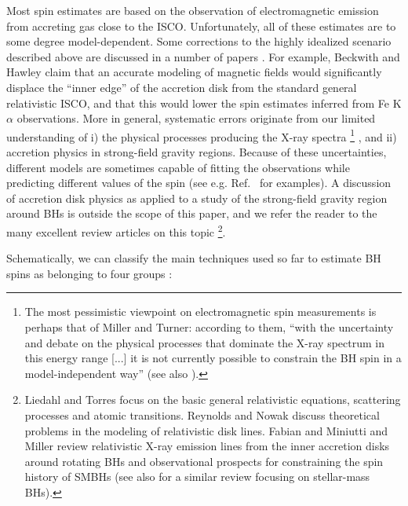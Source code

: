 \documentclass[]{iopart}
\begin{document}
Most spin estimates are based on the observation of electromagnetic emission
from accreting gas close to the ISCO. Unfortunately, all of these estimates
are to some degree model-dependent. Some corrections to the highly idealized
scenario described above are discussed in a number of papers
\cite{Zhang:1997dy,Reynolds:2007rx,Beckwith:2008pu}. For example, Beckwith and
Hawley \cite{Beckwith:2008pu} claim that an accurate modeling of magnetic
fields would significantly displace the ``inner edge'' of the accretion disk
from the standard general relativistic ISCO, and that this would lower the
spin estimates inferred from Fe K$\alpha$ observations. More in general,
systematic errors originate from our limited understanding of i) the physical
processes producing the X-ray spectra 
%
\footnote{The most pessimistic viewpoint on electromagnetic spin measurements
  is perhaps that of Miller and Turner: according to them, ``with the
  uncertainty and debate on the physical processes that dominate the X-ray
  spectrum in this energy range [...] it is not currently possible to
  constrain the BH spin in a model-independent way'' \cite{Turner:2009mv} (see
  also \cite{Miller:2008zq}).}
%
, and ii) accretion physics in strong-field gravity regions. Because of these
uncertainties, different models are sometimes capable of fitting the
observations while predicting different values of the spin (see
e.g. Ref.~\cite{Psaltis:2008bb} for examples). A discussion of accretion disk
physics as applied to a study of the strong-field gravity region around BHs is
outside the scope of this paper, and we refer the reader to the many excellent
review articles on this topic
%
\footnote{Liedahl and Torres \cite{Liedahl:2005zb} focus on the basic general
  relativistic equations, scattering processes and atomic
  transitions. Reynolds and Nowak \cite{Reynolds:2002np} discuss theoretical
  problems in the modeling of relativistic disk lines. Fabian and Miniutti
  \cite{Fabian:2005hr} and Miller \cite{Miller:2007tj} review relativistic
  X-ray emission lines from the inner accretion disks around rotating BHs and
  observational prospects for constraining the spin history of SMBHs (see also
  \cite{Miller:2006te} for a similar review focusing on stellar-mass BHs).}.

Schematically, we can classify the main techniques used so far to estimate BH
spins as belonging to four groups
\cite{Narayan:2005ie,Remillard:2006fc,Psaltis:2008bb}:
\end{document}
